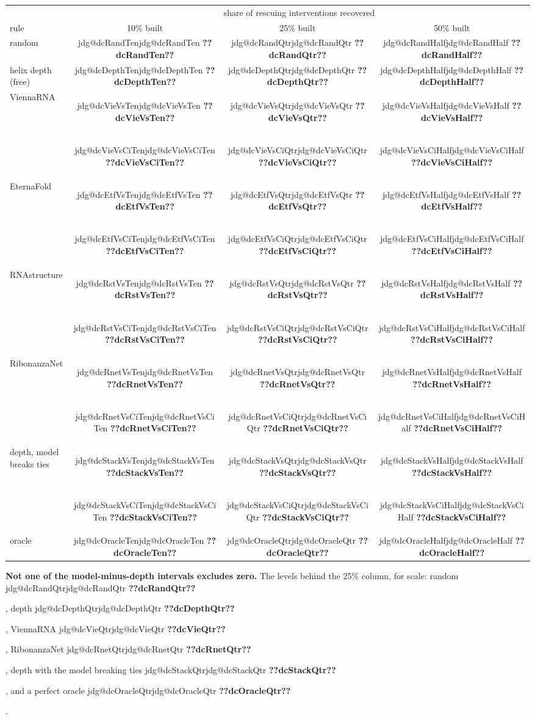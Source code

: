 \documentclass[11pt]{article}
\makeatletter
\newcommand{\jdg}[1]{%
  \ifcsname jdg@#1\endcsname\csname jdg@#1\endcsname
  \else\textbf{??#1??}\PackageError{nm}{undefined measured quantity #1}{}\fi}
\makeatother
\begin{document}
\begin{center}\footnotesize\setlength{\tabcolsep}{4pt}
\begin{tabular}{@{}lccc@{}}
\toprule
& \multicolumn{3}{c}{share of rescuing interventions recovered} \\
\cmidrule(l){2-4}
rule & 10\% built & 25\% built & 50\% built \\
\midrule
random                & \jdg{dcRandTen}  & \jdg{dcRandQtr}  & \jdg{dcRandHalf} \\
helix depth (free)    & \jdg{dcDepthTen} & \jdg{dcDepthQtr} & \jdg{dcDepthHalf} \\
\midrule
ViennaRNA             & \jdg{dcVieVsTen}~\jdg{dcVieVsCiTen}    & \jdg{dcVieVsQtr}~\jdg{dcVieVsCiQtr}    & \jdg{dcVieVsHalf}~\jdg{dcVieVsCiHalf} \\
EternaFold            & \jdg{dcEtfVsTen}~\jdg{dcEtfVsCiTen}    & \jdg{dcEtfVsQtr}~\jdg{dcEtfVsCiQtr}    & \jdg{dcEtfVsHalf}~\jdg{dcEtfVsCiHalf} \\
RNAstructure          & \jdg{dcRstVsTen}~\jdg{dcRstVsCiTen}    & \jdg{dcRstVsQtr}~\jdg{dcRstVsCiQtr}    & \jdg{dcRstVsHalf}~\jdg{dcRstVsCiHalf} \\
RibonanzaNet          & \jdg{dcRnetVsTen}~\jdg{dcRnetVsCiTen}  & \jdg{dcRnetVsQtr}~\jdg{dcRnetVsCiQtr}  & \jdg{dcRnetVsHalf}~\jdg{dcRnetVsCiHalf} \\
\midrule
depth, model breaks ties & \jdg{dcStackVsTen}~\jdg{dcStackVsCiTen} & \jdg{dcStackVsQtr}~\jdg{dcStackVsCiQtr} & \jdg{dcStackVsHalf}~\jdg{dcStackVsCiHalf} \\
\midrule
oracle                & \jdg{dcOracleTen} & \jdg{dcOracleQtr} & \jdg{dcOracleHalf} \\
\bottomrule
\end{tabular}
\end{center}

\noindent \textbf{Not one of the model-minus-depth intervals excludes zero.} The levels behind the
25\% column, for scale: random \jdg{dcRandQtr}, depth \jdg{dcDepthQtr}, ViennaRNA \jdg{dcVieQtr},
RibonanzaNet \jdg{dcRnetQtr}, depth with the model breaking ties \jdg{dcStackQtr}, and a perfect
oracle \jdg{dcOracleQtr}.
\end{document}
